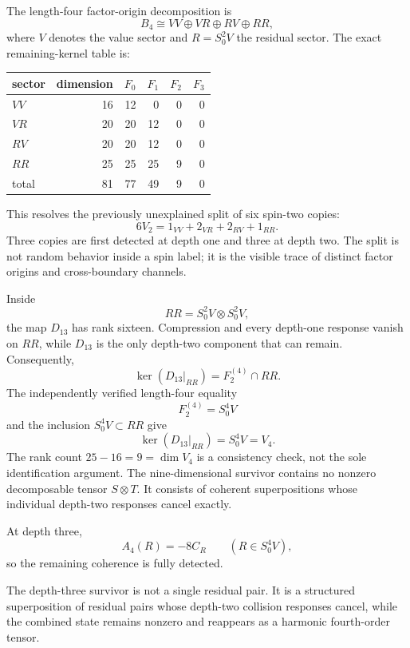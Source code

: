 \documentclass[11pt,a4paper]{article}
\begin{document}
The length-four factor-origin decomposition is
\[
B_4\cong VV\oplus VR\oplus RV\oplus RR,
\]
where $V$ denotes the value sector and $R=S^2_0V$ the residual sector. The exact remaining-kernel table is:

\begin{center}
\renewcommand{\arraystretch}{1.18}
\begin{tabular}{lrrrrr}
\toprule
sector & dimension & $F_0$ & $F_1$ & $F_2$ & $F_3$\\
\midrule
$VV$ & 16 & 12 & 0 & 0 & 0\\
$VR$ & 20 & 20 & 12 & 0 & 0\\
$RV$ & 20 & 20 & 12 & 0 & 0\\
$RR$ & 25 & 25 & 25 & 9 & 0\\
\midrule
total & 81 & 77 & 49 & 9 & 0\\
\bottomrule
\end{tabular}
\end{center}

This resolves the previously unexplained split of six spin-two copies:
\[
6V_2
=
1_{VV}+2_{VR}+2_{RV}+1_{RR}.
\]
Three copies are first detected at depth one and three at depth two. The split is not random behavior inside a spin label; it is the visible trace of distinct factor origins and cross-boundary channels.

Inside
\[
RR=S^2_0V\otimes S^2_0V,
\]
the map $D_{13}$ has rank sixteen. Compression and every depth-one response
vanish on $RR$, while $D_{13}$ is the only depth-two component that can remain.
Consequently,
\[
\ker(D_{13}|_{RR})=F_2^{(4)}\cap RR.
\]
The independently verified length-four equality
\[
F_2^{(4)}=S^4_0V
\]
and the inclusion $S^4_0V\subset RR$ give
\[
\boxed{
\ker(D_{13}|_{RR})=S^4_0V=V_4.
}
\]
The rank count $25-16=9=\dim V_4$ is a consistency check, not the sole
identification argument. The nine-dimensional survivor contains no nonzero
decomposable tensor $S\otimes T$. It consists of coherent superpositions whose
individual depth-two responses cancel exactly.

At depth three,
\[
A_4(R)=-8C_R
\qquad(R\in S^4_0V),
\]
so the remaining coherence is fully detected.

\begin{resultbox}
The depth-three survivor is not a single residual pair. It is a structured superposition of residual pairs whose depth-two collision responses cancel, while the combined state remains nonzero and reappears as a harmonic fourth-order tensor.
\end{resultbox}
\end{document}
